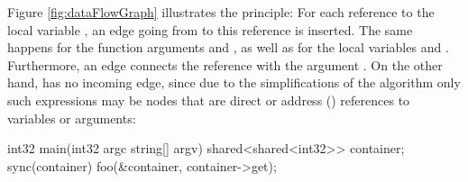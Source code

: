 Figure \ref{fig:dataFlowGraph} illustrates the principle: For each reference to the local variable , an edge going from  to this reference is inserted. The same happens for the function arguments  and , as well as for the local variables  and . Furthermore, an edge connects the  reference with the argument . On the other hand,  has no incoming edge, since due to the simplifications of the algorithm only such expressions may be nodes that are direct or address (\CODE{\&}) references to variables or arguments:

\begin{minipage}{1\textwidth}
\begin{center}
\begin{minipage}{0.4\textwidth}
\begin{ccode}{}
int32 main(int32 argc string[] argv) {
  shared<shared<int32>> container;
  sync(container) { 
    foo(&container, container->get); 
  }
}


\end{ccode}
\end{minipage}
\end{center}
\end{minipage}
